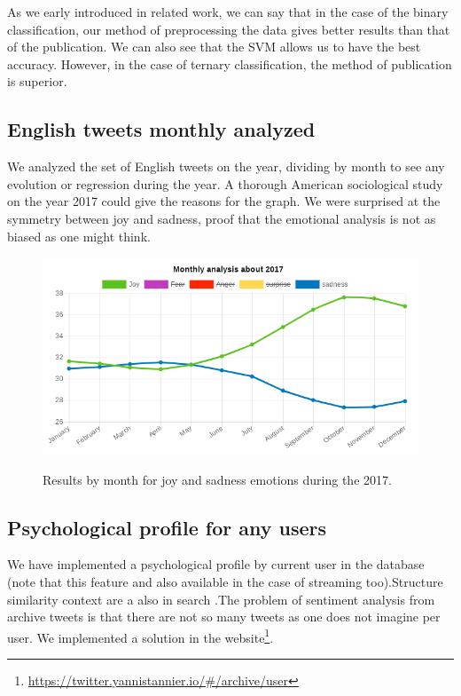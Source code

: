\documentclass{acmtog} %
\begin{document}
As we early introduced in related work, we can say that in the case of the binary classification, our method of preprocessing the data gives better results than that of the publication.
We can also see that the SVM allows us to have the best accuracy.
However, in the case of ternary classification, the method of publication is superior.


\subsection{English tweets monthly analyzed}
\label{subsub:english_tweets_monthly}

We analyzed the set of English tweets on the year, dividing by month to see any evolution or regression during the year. A thorough American sociological study on the year 2017 could give the reasons for the graph. We were surprised at the symmetry between joy and sadness, proof that the emotional analysis is not as biased as one might think. 


\begin{figure}[H]
{\includegraphics[width=\linewidth]{monthly_analysis_joy_sadness-exemple.png}}
\caption{Results by month for joy and sadness emotions during the 2017.}
  \label{fig:trump_results}
\end{figure}




\subsection{Psychological profile for any users}
\label{subsub:psychological_profile}

We have implemented a psychological profile by current user in the database (note that this feature and also available in the case of streaming too).Structure similarity context are a also in search \cite{Zou18}.The problem of sentiment analysis from archive tweets is that there are not so many tweets as one does not imagine per user.
We implemented a solution in the website\footnote{\url{https://twitter.yannistannier.io/#/archive/user}}.
\end{document}

